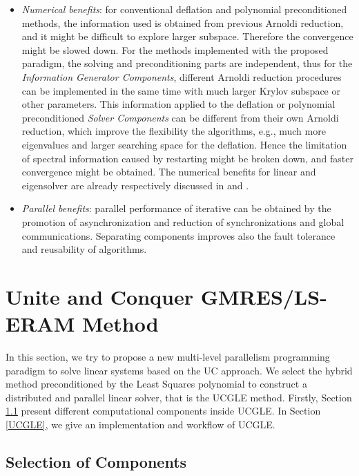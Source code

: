 \begin{itemize}
	\item \textit{Numerical benefits}: for conventional deflation and polynomial preconditioned methods, the information used is obtained from previous Arnoldi reduction, and it might be difficult to explore larger subspace. Therefore the convergence might be slowed down. For the methods implemented with the proposed paradigm, the solving and preconditioning parts are independent, thus for the \textit{Information Generator Components}, different Arnoldi reduction procedures can be implemented in the same time with much larger Krylov subspace or other parameters. This information applied to the deflation or polynomial preconditioned \textit{Solver Components} can be different from their own Arnoldi reduction, which improve the flexibility the algorithms, e.g., much more eigenvalues and larger searching space for the deflation. Hence the limitation of spectral information caused by restarting might be broken down, and faster convergence might be obtained. The numerical benefits for linear and eigensolver are already respectively discussed in \cite{Wu:2018:DPA:3149457.3154481} and \cite{emad2005multiple}.
	
	\item \textit{Parallel benefits}: parallel performance of iterative can be obtained by the promotion of asynchronization and reduction of synchronizations and global communications. Separating components improves also the fault tolerance and reusability of algorithms.
\end{itemize}

\section{Unite and Conquer GMRES/LS-ERAM Method}\label{Asynchronous Unite and Conquer GMRES/LS-ERAM Method}

In this section, we try to propose a new multi-level parallelism programming paradigm to solve linear systems based on the UC approach. We select the hybrid method preconditioned by the Least Squares polynomial to construct a distributed and parallel linear solver, that is the UCGLE method. Firstly, Section \ref{Divide of Linear Solvers into Components} present different computational components inside UCGLE. In Section \ref{UCGLE}, we give an implementation and workflow of UCGLE.

\subsection{Selection of Components} \label{Divide of Linear Solvers into Components}

